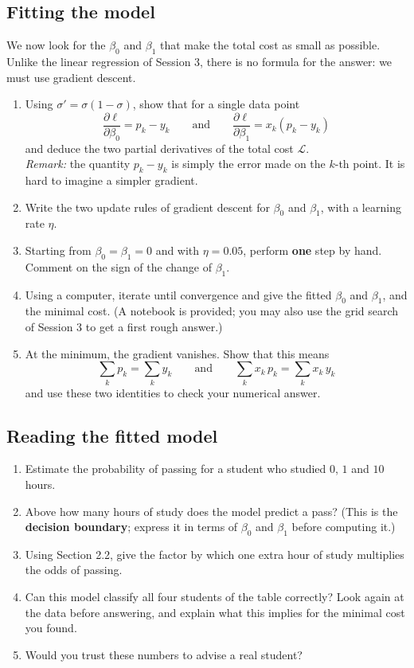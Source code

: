 \documentclass[]{article}
\begin{document}
	\subsection{Fitting the model}
	We now look for the $\beta_0$ and $\beta_1$ that make the total cost as small as possible.
	Unlike the linear regression of Session 3, there is no formula for the answer: we must use gradient descent.

	\begin{enumerate}
		\item Using $\sigma' = \sigma(1-\sigma)$, show that for a single data point
		$$\frac{\partial \ell}{\partial \beta_0} = p_k - y_k
		\qquad \text{and} \qquad
		\frac{\partial \ell}{\partial \beta_1} = x_k \left( p_k - y_k \right)$$
		and deduce the two partial derivatives of the total cost $\mathcal{L}$.\\
		\textit{Remark:} the quantity $p_k - y_k$ is simply the error made on the $k$-th point. It is hard to imagine a simpler gradient.
		\item Write the two update rules of gradient descent for $\beta_0$ and $\beta_1$, with a learning rate $\eta$.
		\item Starting from $\beta_0 = \beta_1 = 0$ and with $\eta = 0.05$, perform \textbf{one} step by hand.
		Comment on the sign of the change of $\beta_1$.
		\item Using a computer, iterate until convergence and give the fitted $\beta_0$ and $\beta_1$, and the minimal cost.
		(A notebook is provided; you may also use the grid search of Session 3 to get a first rough answer.)
		\item At the minimum, the gradient vanishes.
		Show that this means
		$$\sum_{k} p_k = \sum_{k} y_k
		\qquad \text{and} \qquad
		\sum_{k} x_k \, p_k = \sum_{k} x_k \, y_k$$
		and use these two identities to check your numerical answer.
	\end{enumerate}

	\subsection{Reading the fitted model}
	\begin{enumerate}
		\item Estimate the probability of passing for a student who studied $0$, $1$ and $10$ hours.
		\item Above how many hours of study does the model predict a pass?
		(This is the \textbf{decision boundary}; express it in terms of $\beta_0$ and $\beta_1$ before computing it.)
		\item Using Section 2.2, give the factor by which one extra hour of study multiplies the odds of passing.
		\item Can this model classify all four students of the table correctly?
		Look again at the data before answering, and explain what this implies for the minimal cost you found.
		\item Would you trust these numbers to advise a real student?
	\end{enumerate}
\end{document}
